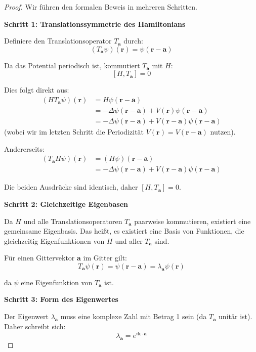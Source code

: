 \documentclass[a4paper,12pt]{article}
\theoremstyle{definition}
\begin{document}
\begin{proof}
	Wir führen den formalen Beweis in mehreren Schritten.
	
	\textbf{Schritt 1: Translationssymmetrie des Hamiltonians}
	
	Definiere den Translationsoperator $T_{\mathbf{a}}$ durch:
	\[
	(T_{\mathbf{a}} \psi)(\mathbf{r}) = \psi(\mathbf{r} - \mathbf{a})
	\]
	
	Da das Potential periodisch ist, kommutiert $T_{\mathbf{a}}$ mit $H$:
	\[
	[H, T_{\mathbf{a}}] = 0
	\]
	
	Dies folgt direkt aus:
	\begin{align}
		(HT_{\mathbf{a}} \psi)(\mathbf{r}) &= H\psi(\mathbf{r} - \mathbf{a}) \\
		&= -\Delta \psi(\mathbf{r} - \mathbf{a}) + V(\mathbf{r})\psi(\mathbf{r} - \mathbf{a}) \\
		&= -\Delta \psi(\mathbf{r} - \mathbf{a}) + V(\mathbf{r} - \mathbf{a})\psi(\mathbf{r} - \mathbf{a})
	\end{align}
	(wobei wir im letzten Schritt die Periodizität $V(\mathbf{r}) = V(\mathbf{r} - \mathbf{a})$ nutzen).
	
	Andererseits:
	\begin{align}
		(T_{\mathbf{a}} H \psi)(\mathbf{r}) &= (H \psi)(\mathbf{r} - \mathbf{a}) \\
		&= -\Delta \psi(\mathbf{r} - \mathbf{a}) + V(\mathbf{r} - \mathbf{a})\psi(\mathbf{r} - \mathbf{a})
	\end{align}
	
	Die beiden Ausdrücke sind identisch, daher $[H, T_{\mathbf{a}}] = 0$.
	
	\textbf{Schritt 2: Gleichzeitige Eigenbasen}
	
	Da $H$ und alle Translationsoperatoren $T_{\mathbf{a}}$ paarweise kommutieren, existiert eine gemeinsame Eigenbasis. Das heißt, es existiert eine Basis von Funktionen, die gleichzeitig Eigenfunktionen von $H$ und aller $T_{\mathbf{a}}$ sind.
	
	Für einen Gittervektor $\mathbf{a}$ im Gitter gilt:
	\[
	T_{\mathbf{a}} \psi(\mathbf{r}) = \psi(\mathbf{r} - \mathbf{a}) = \lambda_{\mathbf{a}} \psi(\mathbf{r})
	\]
	
	da $\psi$ eine Eigenfunktion von $T_{\mathbf{a}}$ ist.
	
	\textbf{Schritt 3: Form des Eigenwertes}
	
	Der Eigenwert $\lambda_{\mathbf{a}}$ muss eine komplexe Zahl mit Betrag 1 sein (da $T_{\mathbf{a}}$ unitär ist). Daher schreibt sich:
	\[
	\lambda_{\mathbf{a}} = e^{i \mathbf{k} \cdot \mathbf{a}}
	\]
	

\end{proof}
\end{document}
